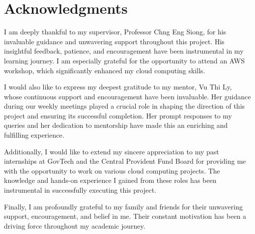 \chapter*{Acknowledgments}

I am deeply thankful to my supervisor, Professor Chng Eng Siong, for his invaluable guidance and unwavering support throughout this project. His insightful feedback, patience, and encouragement have been instrumental in my learning journey. I am especially grateful for the opportunity to attend an AWS workshop, which significantly enhanced my cloud computing skills. 

I would also like to express my deepest gratitude to my mentor, Vu Thi Ly, whose continuous support and encouragement have been invaluable. Her guidance during our weekly meetings played a crucial role in shaping the direction of this project and ensuring its successful completion. Her prompt responses to my queries and her dedication to mentorship have made this an enriching and fulfilling experience.

Additionally, I would like to extend my sincere appreciation to my past internships at GovTech and the Central Provident Fund Board for providing me with the opportunity to work on various cloud computing projects. The knowledge and hands-on experience I gained from these roles has been instrumental in successfully executing this project.

Finally, I am profoundly grateful to my family and friends for their unwavering support, encouragement, and belief in me. Their constant motivation has been a driving force throughout my academic journey.

